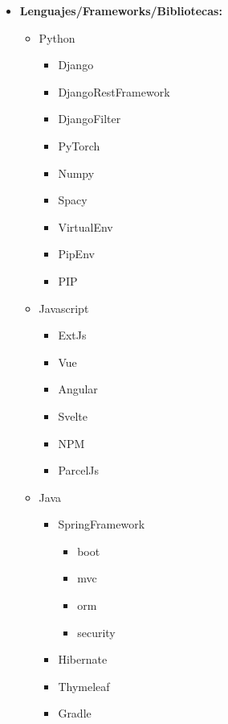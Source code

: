 \begin{multicols}{3}
\begin{itemize}
\setlength\itemsep{0pt}
\setlength\parskip{0pt}
\item
    \textbf{Lenguajes/Frameworks/Bibliotecas:}
    \begin{itemize}
        \item Python
            \begin{itemize}
                \item Django
                \item DjangoRestFramework
                \item DjangoFilter
                \item PyTorch
                \item Numpy
                \item Spacy
                \item VirtualEnv
                \item PipEnv
                \item PIP
            \end{itemize}
        \item Javascript
            \begin{itemize}
                \item ExtJs
                \item Vue
                \item Angular
                \item Svelte
                \item NPM
                \item ParcelJs
            \end{itemize}
        \item Java
            \begin{itemize}
                \item SpringFramework
                    \begin{itemize}
                        \item boot
                        \item mvc
                        \item orm
                        \item security
                    \end{itemize}
                \item Hibernate
                \item Thymeleaf
                \item Gradle

\end{itemize}
\end{itemize}
\end{itemize}
\end{multicols}
